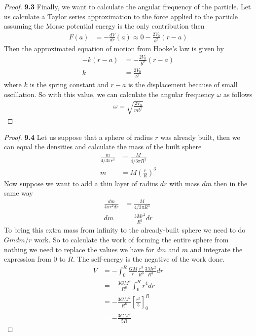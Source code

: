 \documentclass[11pt]{article}
\theoremstyle{definition}
\begin{document}
\begin{proof}{\textbf{9.3}}
        Finally, we want to calculate the angular frequency of the particle.
        Let us calculate a Taylor series approximation to the force applied to
        the particle assuming the Morse potential energy is the only
        contribution then
        \begin{align*}
            F(a) &= -\frac{dV}{dr}(a) \approx 0 - \frac{2V_0}{b^2}(r - a)
        \end{align*}
        Then the approximated equation of motion from Hooke's law is given by
        \begin{align*}
            -k(r-a) &= -\frac{2V_0}{b^2}(r - a)\\
            k &= \frac{2V_0}{b^2}
        \end{align*}
        where $k$ is the spring constant and $r-a$ is the displacement
        because of small oscillation.
        So with this value, we can calculate the angular frequency $\omega$
        as follows
        \begin{align*}
            \omega = \sqrt{\frac{2V_0}{mb^2}}
        \end{align*}
    \end{proof}
	\begin{proof}{\textbf{9.4}}
        Let us suppose that a sphere of radius $r$ was already built, then we
        can equal the densities and calculate the mass of the built sphere
        \begin{align*}
            \frac{m}{4/3\pi r^3} &= \frac{M}{4/3\pi R^3}\\
            m &= M\left(\frac{r}{R}\right)^3
        \end{align*}
        Now suppose we want to add a thin layer of radius $dr$ with mass $dm$
        then in the same way
        \begin{align*}
            \frac{dm}{4 \pi r^2 dr} &= \frac{M}{4/3 \pi R^3}\\
            dm &= \frac{3M r^2}{R^3} dr
        \end{align*}
        To bring this extra mass from infinity to the already-built sphere we
        need to do $Gmdm/r$ work. So to calculate the work of forming the
        entire sphere from nothing we need to replace the values we have for
        $dm$ and $m$ and integrate the expression from $0$ to $R$. The
        self-energy is the negative of the work done.
        \begin{align*}
            V &= -\int_0^R \frac{GM}{r}\frac{r^3}{R^3}\frac{3M r^2}{R^3} dr\\
              &= -\frac{3GM^2}{R^6} \int_0^R r^4 dr\\
              &= -\frac{3GM^2}{R^6}\left[\frac{r^5}{5}\right]_0^R\\
              &= -\frac{3GM^2}{5R}
        \end{align*}
    \end{proof}
\end{document}
